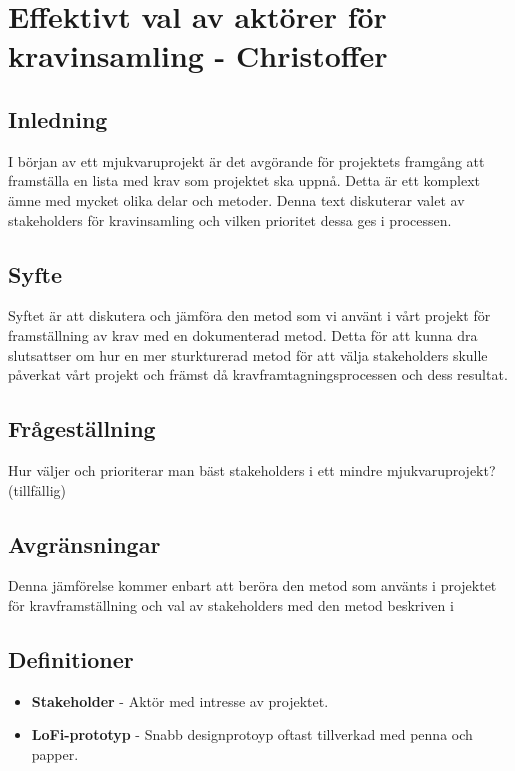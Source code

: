 \chapter{Effektivt val av aktörer för \\kravinsamling - Christoffer}

\section{Inledning}
I början av ett mjukvaruprojekt är det avgörande för projektets framgång att framställa en lista med krav som projektet ska uppnå. Detta är ett komplext ämne med mycket olika delar och metoder. Denna text diskuterar valet av stakeholders för kravinsamling och vilken prioritet dessa ges i processen.

\section{Syfte}
Syftet är att diskutera och jämföra den metod som vi använt i vårt projekt för framställning av krav med en dokumenterad metod. Detta för att kunna dra slutsattser om hur en mer sturkturerad metod för att välja stakeholders skulle påverkat vårt projekt och främst då kravframtagningsprocessen och dess resultat.

\section{Frågeställning}
Hur väljer och prioriterar man bäst stakeholders i ett mindre mjukvaruprojekt? (tillfällig)

\section{Avgränsningar}
Denna jämförelse kommer enbart att beröra den metod som använts i projektet för kravframställning och val av stakeholders med den metod beskriven i  

\section{Definitioner}
\begin{itemize}
	\item \textbf{Stakeholder} - Aktör med intresse av projektet.
	\item \textbf{LoFi-prototyp} - Snabb designprotoyp oftast tillverkad med penna och papper.
\end{itemize}


